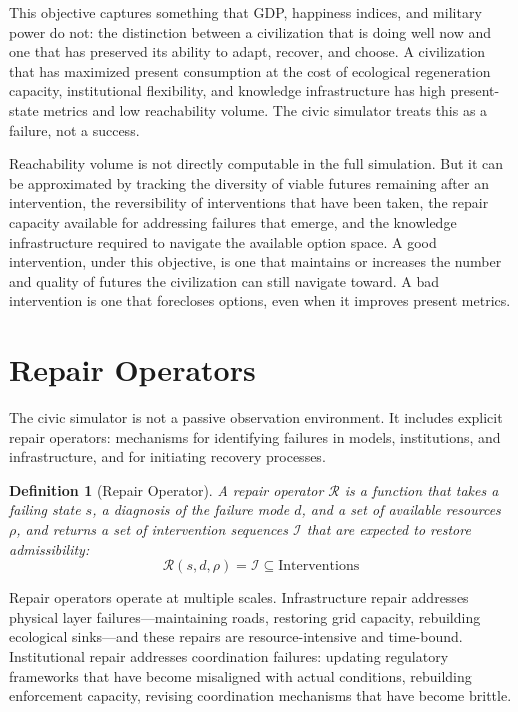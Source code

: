 \documentclass[12pt]{article}
\newtheorem{definition}{Definition}
\begin{document}
This objective captures something that GDP, happiness indices, and military power do not: the distinction between a civilization that is doing well now and one that has preserved its ability to adapt, recover, and choose. A civilization that has maximized present consumption at the cost of ecological regeneration capacity, institutional flexibility, and knowledge infrastructure has high present-state metrics and low reachability volume. The civic simulator treats this as a failure, not a success.

Reachability volume is not directly computable in the full simulation. But it can be approximated by tracking the diversity of viable futures remaining after an intervention, the reversibility of interventions that have been taken, the repair capacity available for addressing failures that emerge, and the knowledge infrastructure required to navigate the available option space. A good intervention, under this objective, is one that maintains or increases the number and quality of futures the civilization can still navigate toward. A bad intervention is one that forecloses options, even when it improves present metrics.

\section{Repair Operators}

The civic simulator is not a passive observation environment. It includes explicit repair operators: mechanisms for identifying failures in models, institutions, and infrastructure, and for initiating recovery processes.

\begin{definition}[Repair Operator]
A repair operator $\mathcal{R}$ is a function that takes a failing state $s$, a diagnosis of the failure mode $d$, and a set of available resources $\rho$, and returns a set of intervention sequences $\mathcal{I}$ that are expected to restore admissibility:
\begin{equation}
  \mathcal{R}(s, d, \rho) = \mathcal{I} \subseteq \text{Interventions}
\end{equation}
\end{definition}

Repair operators operate at multiple scales. Infrastructure repair addresses physical layer failures---maintaining roads, restoring grid capacity, rebuilding ecological sinks---and these repairs are resource-intensive and time-bound. Institutional repair addresses coordination failures: updating regulatory frameworks that have become misaligned with actual conditions, rebuilding enforcement capacity, revising coordination mechanisms that have become brittle.
\end{document}
